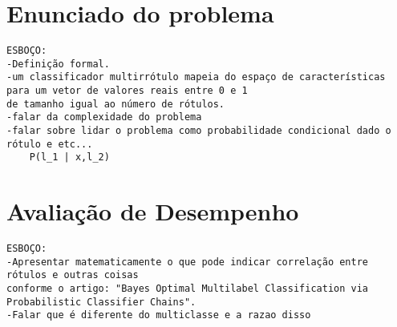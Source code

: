 

\section{Enunciado do problema}
\begin{verbatim}
ESBOÇO:
-Definição formal.
-um classificador multirrótulo mapeia do espaço de características
para um vetor de valores reais entre 0 e 1 
de tamanho igual ao número de rótulos.
-falar da complexidade do problema
-falar sobre lidar o problema como probabilidade condicional dado o rótulo e etc...
    P(l_1 | x,l_2)
\end{verbatim}



\section{Avaliação de Desempenho}
\begin{verbatim}
ESBOÇO:
-Apresentar matematicamente o que pode indicar correlação entre rótulos e outras coisas
conforme o artigo: "Bayes Optimal Multilabel Classification via Probabilistic Classifier Chains".
-Falar que é diferente do multiclasse e a razao disso
\end{verbatim}

